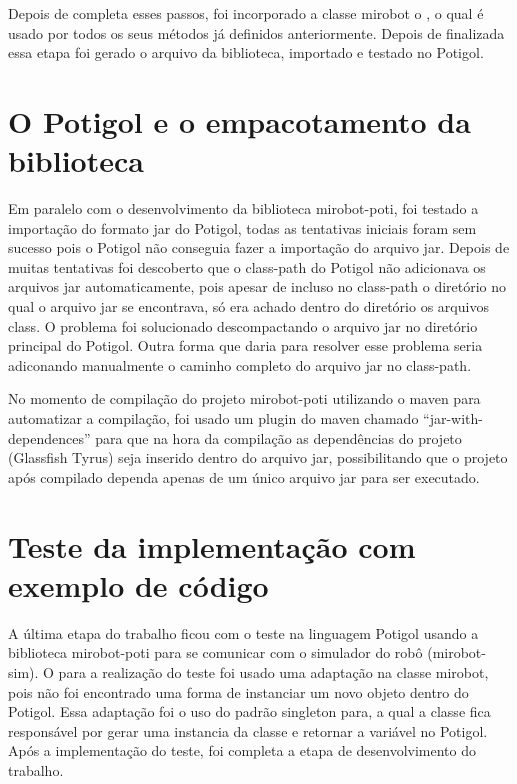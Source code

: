 Depois de completa esses passos, foi incorporado a classe mirobot o , o qual é usado por todos os seus métodos já
definidos anteriormente. Depois de finalizada essa etapa foi gerado o arquivo
da biblioteca, importado e testado no Potigol.

\section{O Potigol e o empacotamento da biblioteca}
\label{sec:empacotamento}

Em paralelo com o desenvolvimento da biblioteca mirobot-poti, foi testado a
importação do formato jar do Potigol, todas as tentativas iniciais foram sem
sucesso pois o Potigol não conseguia fazer a importação do arquivo jar. Depois
de muitas tentativas foi descoberto que o class-path do Potigol não adicionava
os arquivos jar automaticamente, pois apesar de incluso no class-path o
diretório no qual o arquivo jar se encontrava, só era achado dentro do diretório
os arquivos class. O problema foi solucionado descompactando o arquivo jar no diretório
principal do Potigol. Outra forma que daria para resolver esse problema seria adiconando
manualmente o caminho completo do arquivo jar no class-path.

No momento de compilação do projeto mirobot-poti utilizando o maven para
automatizar a compilação, foi usado um plugin do maven chamado
``jar-with-dependences'' para que na hora da compilação as dependências do
projeto (Glassfish Tyrus) seja inserido dentro do arquivo jar, possibilitando
que o projeto após compilado dependa apenas de um único arquivo jar para ser
executado.

\section{Teste da implementação com exemplo de código}
\label{sec:testemirobot}

A última etapa do trabalho ficou com o teste na linguagem Potigol usando a
biblioteca mirobot-poti para se comunicar com o simulador do robô
(mirobot-sim). O para a realização do teste foi usado uma adaptação na classe
mirobot, pois não foi encontrado uma forma de instanciar um novo objeto dentro
do Potigol. Essa adaptação foi o uso do padrão singleton para, a qual a classe
fica responsável por gerar uma instancia da classe e retornar a variável no
Potigol. Após a implementação do teste, foi completa a etapa de desenvolvimento
do trabalho.

